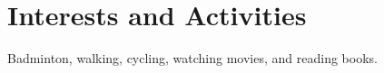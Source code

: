 \documentclass[a4paper, 11pt]{article}
\begin{document}
	\section{Interests and Activities}
	Badminton, walking, cycling, watching movies, and reading books.
	
\end{document}
